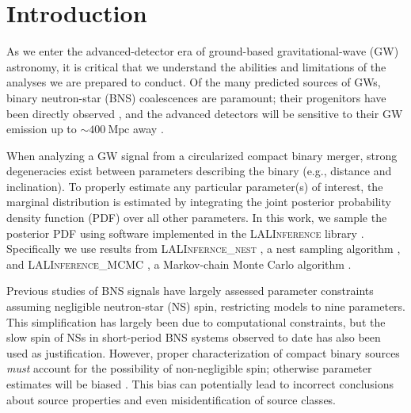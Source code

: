 \section{Introduction}

As we enter the advanced-detector era of ground-based gravitational-wave (GW) astronomy, it is critical that we understand the abilities and limitations of the analyses we are prepared to conduct. Of the many predicted sources of GWs, binary neutron-star (BNS) coalescences are paramount; their progenitors have been directly observed \cite{Lorimer_2008}, and the advanced detectors will be sensitive to their GW emission up to $\sim 400~\mathrm{Mpc}$ away \citep{2013arXiv1304.0670L}.

When analyzing a GW signal from a circularized compact binary merger, strong degeneracies exist between parameters describing the binary (e.g., distance and inclination). To properly estimate any particular parameter(s) of interest, the marginal distribution is estimated by integrating the joint posterior probability density function (PDF) over all other parameters. In this work, we sample the posterior PDF using software implemented in the \textsc{LALInference} library \citep{Veitch_2014}. Specifically we use results from \textsc{LALInfernce\_nest} \linebreak \citep{Veitch_2010}, a nest sampling algorithm \citep{Skilling2006}, and \textsc{LALInference\_MCMC} \citep{Christensen_2003,R_ver_2006,van_der_Sluys_2008}, a Markov-chain Monte Carlo algorithm \citep[chapter 12]{Gregory2005}.

Previous studies of BNS signals have largely assessed parameter constraints assuming negligible neutron-star (NS) spin, restricting models to nine parameters. This simplification has largely been due to computational constraints, but the slow spin of NSs in short-period BNS systems observed to date \citep[e.g.,][]{Mandel_2010} has also been used as justification. However, proper characterization of compact binary sources \textit{must} account for the possibility of non-negligible spin; otherwise parameter estimates will be biased \citep{Buonanno_2009,Berry_2014}.  This bias can potentially lead to incorrect conclusions about source properties and even misidentification of source classes.

